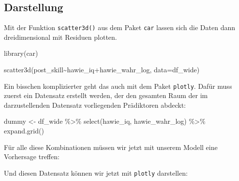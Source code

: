 \documentclass[
]{book}
\newenvironment{Shaded}{\begin{snugshade}}{\end{snugshade}}
\newcommand{\AttributeTok}[1]{\textcolor[rgb]{0.77,0.63,0.00}{#1}}
\newcommand{\FunctionTok}[1]{\textcolor[rgb]{0.00,0.00,0.00}{#1}}
\newcommand{\NormalTok}[1]{#1}
\newcommand{\OtherTok}[1]{\textcolor[rgb]{0.56,0.35,0.01}{#1}}
\newcommand{\SpecialCharTok}[1]{\textcolor[rgb]{0.00,0.00,0.00}{#1}}
\begin{document}
\hypertarget{darstellung}{%
\subsection{Darstellung}\label{darstellung}}

Mit der Funktion \texttt{scatter3d()} aus dem Paket \texttt{car} lassen sich die Daten dann dreidimensional mit Residuen plotten.

\begin{Shaded}
\begin{Highlighting}[]
\FunctionTok{library}\NormalTok{(car)}

\FunctionTok{scatter3d}\NormalTok{(post\_skill}\SpecialCharTok{\textasciitilde{}}\NormalTok{hawie\_iq}\SpecialCharTok{+}\NormalTok{hawie\_wahr\_log, }
          \AttributeTok{data=}\NormalTok{df\_wide)}
\end{Highlighting}
\end{Shaded}

Ein bisschen komplizierter geht das auch mit dem Paket \texttt{plotly}. Dafür muss zuerst ein Datensatz erstellt werden, der den gesamten Raum der im darzustellenden Datensatz vorliegenden Prädiktoren abdeckt:

\begin{Shaded}
\begin{Highlighting}[]
\NormalTok{dummy }\OtherTok{\textless{}{-}}\NormalTok{  df\_wide }\SpecialCharTok{\%\textgreater{}\%} 
  \FunctionTok{select}\NormalTok{(hawie\_iq, hawie\_wahr\_log) }\SpecialCharTok{\%\textgreater{}\%} 
  \FunctionTok{expand.grid}\NormalTok{()}
\end{Highlighting}
\end{Shaded}

Für alle diese Kombinationen müssen wir jetzt mit unserem Modell eine Vorhersage treffen:

\begin{Shaded}
\end{Shaded}

Und diesen Datensatz können wir jetzt mit \texttt{plotly} darstellen:
\end{document}
